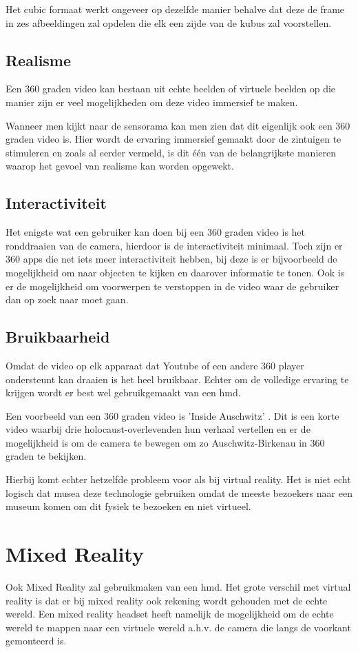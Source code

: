 Het cubic formaat werkt ongeveer op dezelfde manier behalve dat deze de frame in zes afbeeldingen zal opdelen die elk een zijde van de kubus zal voorstellen.

\subsection{Realisme}
Een 360 graden video kan bestaan uit echte beelden of virtuele beelden op die manier zijn er veel mogelijkheden om deze video immersief te maken. 

Wanneer men kijkt naar de sensorama kan men zien dat dit eigenlijk ook een 360 graden video is. Hier wordt de ervaring immersief gemaakt door de zintuigen te stimuleren en zoals al eerder vermeld, is dit één van de belangrijkste manieren waarop het gevoel van realisme kan worden opgewekt.

\subsection{Interactiviteit}
Het enigste wat een gebruiker kan doen bij een 360 graden video is het ronddraaien van de camera, hierdoor is de interactiviteit minimaal. Toch zijn er 360 apps die net iets meer interactiviteit hebben, bij deze is er bijvoorbeeld de mogelijkheid om naar objecten te kijken en daarover informatie te tonen. Ook is er de mogelijkheid om voorwerpen te verstoppen in de video waar de gebruiker dan op zoek naar moet gaan.
\subsection{Bruikbaarheid}
Omdat de video op elk apparaat dat Youtube of een andere 360 player ondersteunt kan draaien is het heel bruikbaar. Echter om de volledige ervaring te krijgen wordt er best wel gebruikgemaakt van een \acrshort{hmd}.

Een voorbeeld van een 360 graden video is 'Inside Auschwitz' \autocite{WDR2017}. Dit is een korte video waarbij drie holocaust-overlevenden hun verhaal vertellen en er de mogelijkheid is om de camera te bewegen om zo Auschwitz-Birkenau in 360 graden te bekijken. 

Hierbij komt echter hetzelfde probleem voor als bij virtual reality. Het is niet echt logisch dat musea deze technologie gebruiken omdat de meeste bezoekers naar een museum komen om dit fysiek te bezoeken en niet virtueel.

\section{Mixed Reality} \label{sec:mixedreality}
Ook Mixed Reality zal gebruikmaken van een \acrshort{hmd}. Het grote verschil met virtual reality is dat er bij mixed reality ook rekening wordt gehouden met de echte wereld. Een mixed reality headset heeft namelijk de mogelijkheid om de echte wereld te mappen naar een virtuele wereld a.h.v. de camera die langs de voorkant gemonteerd is.

